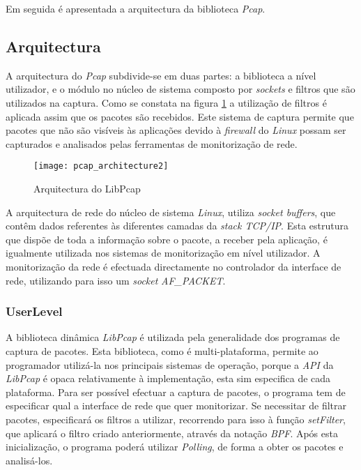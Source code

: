Em seguida é apresentada a arquitectura da biblioteca \textit{Pcap}.

\subsection {Arquitectura}
\label{sect:architecture_libpcap}
A arquitectura do \textit{Pcap} subdivide-se em duas partes: a biblioteca a nível utilizador, e o módulo no núcleo de sistema composto por \textit{sockets} e filtros que são utilizados na captura.
Como se constata na figura \ref{fig:pcap_architecture} a utilização de filtros é aplicada assim que os pacotes são recebidos.
Este sistema de captura permite que pacotes que não são visíveis às aplicações devido à \textit{firewall} do \textit{Linux} possam ser capturados e analisados pelas ferramentas de monitorização de rede.

\begin{figure}[h]
       \centering
       \texttt{[image: pcap\_architecture2]}
       \caption{Arquitectura do LibPcap}
      \label{fig:pcap_architecture}
\end{figure}

A arquitectura de rede do núcleo de sistema \textit{Linux}, utiliza \textit{socket buffers}, que contêm dados referentes às diferentes camadas da \textit{stack TCP/IP}.
Esta estrutura que dispõe de toda a informação sobre o pacote, a receber pela aplicação, é igualmente utilizada nos sistemas de monitorização em nível utilizador.
A monitorização da rede é efectuada directamente no controlador da interface de rede, utilizando para isso um \textit{socket} \textit{AF\_PACKET}.

\subsubsection{UserLevel}

A biblioteca dinâmica \textit{LibPcap} é utilizada pela generalidade dos programas de captura de pacotes.
Esta biblioteca, como é multi-plataforma, permite ao programador utilizá-la nos principais sistemas de operação, porque a \textit{API} da \textit{LibPcap} é opaca relativamente à implementação, esta sim especifica de cada plataforma.
Para ser possível efectuar a captura de pacotes, o programa tem de especificar qual a interface de rede que quer monitorizar.
Se necessitar de filtrar pacotes, especificará os filtros a utilizar, recorrendo para isso à função \textit{setFilter}, que aplicará o filtro criado anteriormente, através da notação \textit{BPF}.
Após esta inicialização, o programa poderá utilizar \textit{Polling}, de forma a obter os pacotes e analisá-los.

